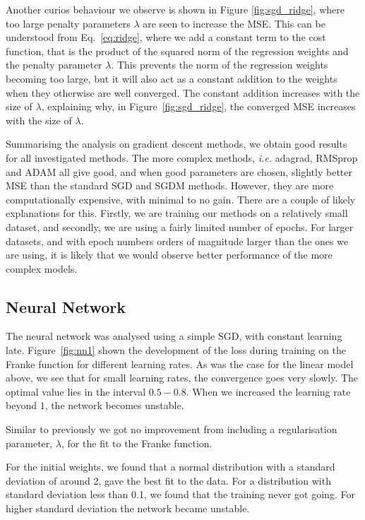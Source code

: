 \documentclass[a4paper,
amsfonts,
amssymb,
amsmath,
reprint,
showkeys,
nofootinbib,
twoside]{revtex4-2}
\begin{document}
Another curios behaviour we observe is shown in Figure \ref{fig:sgd_ridge}, where too large penalty parameters $\lambda$ are seen to increase the MSE. This can be understood from Eq.~\eqref{eq:ridge}, where we add a constant term to the cost function, that is the product of the squared norm of the regression weights and the penalty parameter $\lambda$. This prevents the norm of the regression weights becoming too large, but it will also act as a constant addition to the weights when they otherwise are well converged. The constant addition increases with the size of $\lambda$, explaining why, in Figure~\ref{fig:sgd_ridge}, the converged MSE increases with the size of $\lambda$.

Summarising the analysis on gradient descent methods, we obtain good results for all investigated methods. The more complex methods, \textit{i.e.} adagrad, RMSprop and ADAM all give good, and when good parameters are chosen, slightly better MSE than the standard SGD and SGDM methods. However, they are more computationally expensive, with minimal to no gain. There are a couple of likely explanations for this. Firstly, we are training our methods on a relatively small dataset, and secondly, we are using a fairly limited number of epochs. For larger datasets, and with epoch numbers orders of magnitude larger than the ones we are using, it is likely that we would observe better performance of the more complex models.

\subsection{Neural Network}

The neural network was analysed using a simple SGD, with constant learning late. Figure~\ref{fig:nn1} shown the development of the loss during training on the Franke function for different learning rates. As was the case for the linear model above, we see that for small learning rates, the convergence goes very slowly. The optimal value lies in the interval $0.5-0.8$. When we increased the learning rate beyond $1$, the network becomes unstable.

Similar to previously we got no improvement from including a regularisation parameter, $\lambda$, for the fit to the Franke function.

For the initial weights, we found that a normal distribution with a standard deviation of around 2, gave the best fit to the data. For a distribution with standard deviation less than 0.1, we found that the training never got going. For higher standard deviation the network became unstable.
\end{document}
